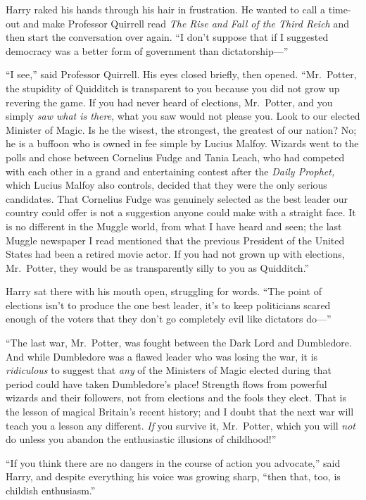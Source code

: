 Harry raked his hands through his hair in frustration. He wanted to call
a time-out and make Professor Quirrell read \emph{The Rise and Fall of
the Third Reich} and then start the conversation over again. ``I don't
suppose that if I suggested democracy was a better form of government
than dictatorship---''

``I see,'' said Professor Quirrell. His eyes closed briefly, then
opened. ``Mr.~Potter, the stupidity of Quidditch is transparent to you
because you did not grow up revering the game. If you had never heard of
elections, Mr.~Potter, and you simply \emph{saw what is there}, what you
saw would not please you. Look to our elected Minister of Magic. Is he
the wisest, the strongest, the greatest of our nation? No; he is a
buffoon who is owned in fee simple by Lucius Malfoy. Wizards went to the
polls and chose between Cornelius Fudge and Tania Leach, who had
competed with each other in a grand and entertaining contest after the
\emph{Daily Prophet,} which Lucius Malfoy also controls, decided that
they were the only serious candidates. That Cornelius Fudge was
genuinely selected as the best leader our country could offer is not a
suggestion anyone could make with a straight face. It is no different in
the Muggle world, from what I have heard and seen; the last Muggle
newspaper I read mentioned that the previous President of the United
States had been a retired movie actor. If you had not grown up with
elections, Mr.~Potter, they would be as transparently silly to you as
Quidditch.''

Harry sat there with his mouth open, struggling for words. ``The point
of elections isn't to produce the one best leader, it's to keep
politicians scared enough of the voters that they don't go completely
evil like dictators do---''

``The last war, Mr.~Potter, was fought between the Dark Lord and
Dumbledore. And while Dumbledore was a flawed leader who was losing the
war, it is \emph{ridiculous} to suggest that \emph{any} of the Ministers
of Magic elected during that period could have taken Dumbledore's place!
Strength flows from powerful wizards and their followers, not from
elections and the fools they elect. That is the lesson of magical
Britain's recent history; and I doubt that the next war will teach you a
lesson any different. \emph{If} you survive it, Mr.~Potter, which you
will \emph{not} do unless you abandon the enthusiastic illusions of
childhood!''

``If you think there are no dangers in the course of action you
advocate,'' said Harry, and despite everything his voice was growing
sharp, ``then that, too, is childish enthusiasm.''

